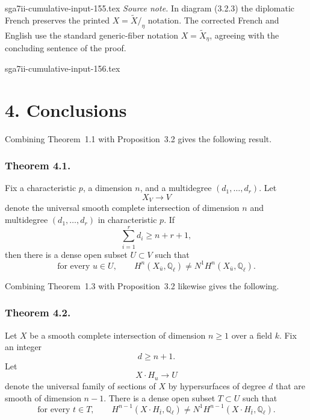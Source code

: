 \begin{filecontents*}{sga7ii-cumulative-input-155.tex}
\medskip
\noindent\emph{Source note.}
In diagram (3.2.3) the diplomatic French preserves the printed
$X=\widetilde X/_{\eta}$ notation.  The corrected French and English use the
standard generic-fiber notation $X=\widetilde X_\eta$, agreeing with the
concluding sentence of the proof.
\end{filecontents*}
\begin{filecontents*}{sga7ii-cumulative-input-156.tex}
\section*{4. Conclusions}

Combining Theorem~1.1 with Proposition~3.2 gives the following result.

\subsubsection*{Theorem 4.1.}
Fix a characteristic $p$, a dimension $n$, and a multidegree
$(d_1,\ldots,d_r)$.  Let
\begin{equation}\tag{4.1.0}
X_V\longrightarrow V
\end{equation}
denote the universal smooth complete intersection of dimension $n$ and
multidegree $(d_1,\ldots,d_r)$ in characteristic $p$.  If
\begin{equation}\tag{4.1.1}
\sum_{i=1}^{r}d_i\geq n+r+1,
\end{equation}
then there is a dense open subset $U\subset V$ such that
\begin{equation}\tag{4.1.2}
\text{for every }u\in U,\qquad
H^n(X_{\bar u},\mathbb Q_\ell)\ne N^1H^n(X_{\bar u},\mathbb Q_\ell).
\end{equation}

Combining Theorem~1.3 with Proposition~3.2 likewise gives the following.

\subsubsection*{Theorem 4.2.}
Let $X$ be a smooth complete intersection of dimension $n\geq1$ over a
field $k$.  Fix an integer
\begin{equation}\tag{4.2.1}
d\geq n+1.
\end{equation}
Let
\begin{equation}\tag{4.2.2}
X\!\cdot\!H_u\longrightarrow U
\end{equation}
denote the universal family of sections of $X$ by hypersurfaces of degree
$d$ that are smooth of dimension $n-1$.  There is a dense open subset
$T\subset U$ such that
\begin{equation}\tag{4.2.3}
\text{for every }t\in T,\qquad
H^{n-1}(X\!\cdot\!H_{\bar t},\mathbb Q_\ell)
\ne N^1H^{n-1}(X\!\cdot\!H_{\bar t},\mathbb Q_\ell).
\end{equation}


\end{filecontents*}
